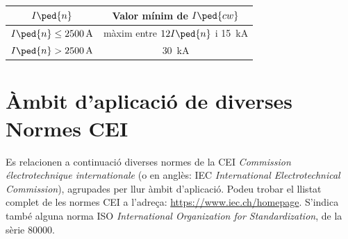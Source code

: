 \begin{list}{}
	\begin{center}
		 \label{taula:InIcw}
		\begin{tabular}{cc}
			\toprule[1pt]
			$I\ped{n}$ &  Valor mínim de $I\ped{cw}$ \\
			\midrule
			$I\ped{n} \leq \qty{2500}{A}$  & màxim entre $12  I\ped{n}$ i \qty{15}{kA}  \\
			$I\ped{n} > \qty{2500}{A}$  & \qty{30}{kA}   \\
			\bottomrule[1pt]
		\end{tabular}
	\end{center}
\end{list}


\section{Àmbit d'aplicació de diverses Normes CEI}\label{sec:normes_IEC}

Es relacionen a continuació diverses normes de la CEI \textit{Commission électrotechnique internationale} (o en anglès: IEC \textit{International Electrotechnical Commission}), agrupades per llur àmbit d'aplicació. Podeu trobar el llistat complet de les normes CEI a l'adreça: \href{https://www.iec.ch/homepage}{https:/\!\!/www.iec.ch/homepage}. S'indica també alguna norma ISO \textit{International Organization for Standardization}, de la sèrie 80000.

